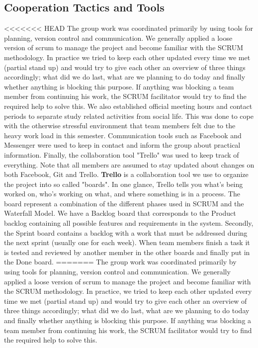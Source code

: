 \subsection{Cooperation Tactics and Tools}
<<<<<<< HEAD
The group work was coordinated primarily by using tools for planning, version control and communication. We generally applied a loose version of scrum to manage the project and become familiar with the SCRUM methodology. In practice we tried to keep each other updated every time we met (partial stand up) and would try to give each other an overview of three things accordingly; what did we do last, what are we planning to do today and finally whether anything is blocking this purpose. If anything was blocking a team member from continuing his work, the SCRUM facilitator would try to find the required help to solve this. 
We also established official meeting hours and contact periods to separate study related activities from social life. This was done to cope with the otherwise stressful environment that team members felt due to the heavy work load in this semester. Communication tools such as Facebook and Messenger were used to keep in contact and inform the group about practical information. Finally, the collaboration tool "Trello"  was used to keep track of everything. Note that all members are assumed to stay updated about changes on both Facebook, Git and Trello. 
\textbf{Trello} is a collaboration tool we use to organize the project into so called "boards". In one glance, Trello tells you what's being worked on, who's working on what, and where something is in a process. The board represent a combination of the different phases used in SCRUM and the Waterfall Model. We have a Backlog board that corresponds to the Product backlog containing all possible features and requirements in the system. Secondly, the Sprint board contains a backlog with a work that must be addressed during the next sprint (usually one for each week). When team members finish a task it is tested and reviewed by another member in the other boards and finally put in the Done board. 
=======
The group work was coordinated primarily by using tools for planning, version control and communication. We generally applied a loose version of scrum to manage the project and become familiar with the SCRUM methodology. In practice, we tried to keep each other updated every time we met (partial stand up) and would try to give each other an overview of three things accordingly; what did we do last, what are we planning to do today and finally whether anything is blocking this purpose. If anything was blocking a team member from continuing his work, the SCRUM facilitator would try to find the required help to solve this. 
